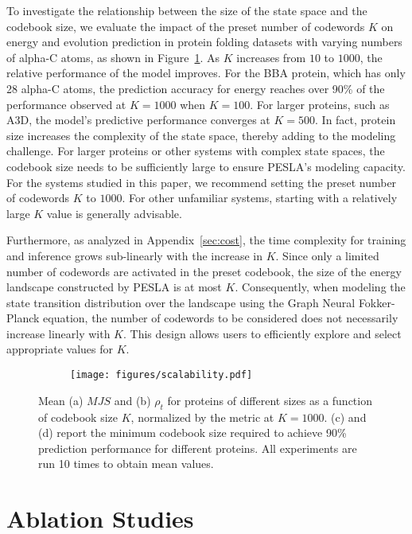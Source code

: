 To investigate the relationship between the size of the state space and the codebook size, we evaluate the impact of the preset number of codewords $K$ on energy and evolution prediction in protein folding datasets with varying numbers of alpha-C atoms, as shown in Figure~\ref{fig:scalability}. As $K$ increases from $10$ to $1000$, the relative performance of the model improves. For the BBA protein, which has only 28 alpha-C atoms, the prediction accuracy for energy reaches over 90\% of the performance observed at $K=1000$ when $K=100$. For larger proteins, such as A3D, the model's predictive performance converges at $K=500$. In fact, protein size increases the complexity of the state space, thereby adding to the modeling challenge. For larger proteins or other systems with complex state spaces, the codebook size needs to be sufficiently large to ensure PESLA’s modeling capacity. For the systems studied in this paper, we recommend setting the preset number of codewords $K$ to $1000$. For other unfamiliar systems, starting with a relatively large $K$ value is generally advisable.

Furthermore, as analyzed in Appendix~\ref{sec:cost}, the time complexity for training and inference grows sub-linearly with the increase in $K$. Since only a limited number of codewords are activated in the preset codebook, the size of the energy landscape constructed by PESLA is at most $K$. Consequently, when modeling the state transition distribution over the landscape using the Graph Neural Fokker-Planck equation, the number of codewords to be considered does not necessarily increase linearly with $K$. This design allows users to efficiently explore and select appropriate values for $K$.

\begin{figure}[!ht]
    \centering
    \begin{subfigure}[b]{0.9\textwidth} %
        \centering
        \texttt{[image: figures/scalability.pdf]}
    \end{subfigure}

    \caption{Mean (a) $MJS$ and (b) $\rho_t$ for proteins of different sizes as a function of codebook size $K$, normalized by the metric at $K = 1000$. (c) and (d) report the minimum codebook size required to achieve 90\% prediction performance for different proteins. All experiments are run 10 times to obtain mean values.}
    \label{fig:scalability}
\end{figure}


\section{Ablation Studies} \label{sec:ablation_study}

